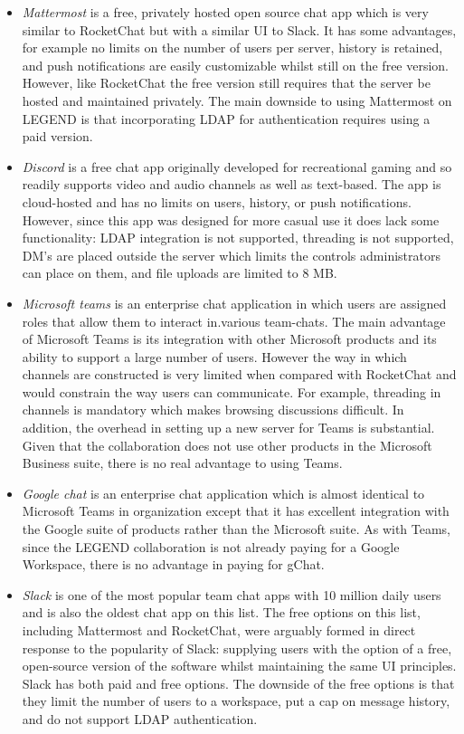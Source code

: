 \documentclass[11pt,letterpaper]{article}
\begin{document}
\begin{itemize}
\item \emph{Mattermost} is a free, privately hosted open source chat app which is very similar to RocketChat but with a similar UI to Slack. It has some advantages, for example no limits on the number of users per server, history is retained, and push notifications are easily customizable whilst still on the free version. However, like RocketChat the free version still requires that the server be hosted and maintained privately. The main downside to using Mattermost on LEGEND is that incorporating LDAP for authentication requires using a paid version. 
\item \emph{Discord} is a free chat app originally developed for recreational gaming and so readily supports video and audio channels as well as text-based. The app is cloud-hosted and has no limits on users, history, or push notifications. However, since this app was designed for more casual use it does lack some functionality: LDAP integration is not supported, threading is not supported, DM's are placed outside the server which limits the controls administrators can place on them, and file uploads are limited to 8 MB.
\item \emph{Microsoft teams} is an enterprise chat application in which users are assigned roles that allow them to interact in.various team-chats. The main advantage of Microsoft Teams is its integration with other Microsoft products and its ability to support a large number of users. However the way in which channels are constructed is very limited when compared with RocketChat and would constrain the way users can communicate. For example, threading in channels is mandatory which makes browsing discussions difficult. In addition, the overhead in setting up a new server for Teams is substantial. Given that the collaboration does not use other products in the Microsoft Business suite, there is no real advantage to using Teams. 
\item \emph{Google chat} is an enterprise chat application which is almost identical to Microsoft Teams in organization except that it has excellent integration with the Google suite of products rather than the Microsoft suite. As with Teams, since the LEGEND collaboration is not already paying for a Google Workspace, there is no advantage in paying for gChat. 
\item \emph{Slack} is one of the most popular team chat apps with 10 million daily users and is also the oldest chat app on this list. The free options on this list, including Mattermost and RocketChat, were arguably formed in direct response to the popularity of Slack: supplying users with the option of a free, open-source version of the software whilst maintaining the same UI principles. Slack has both paid and free options. The downside of the free options is that they limit the number of users to a workspace, put a cap on message history, and do not support LDAP authentication. 
\end{itemize}
\end{document}
